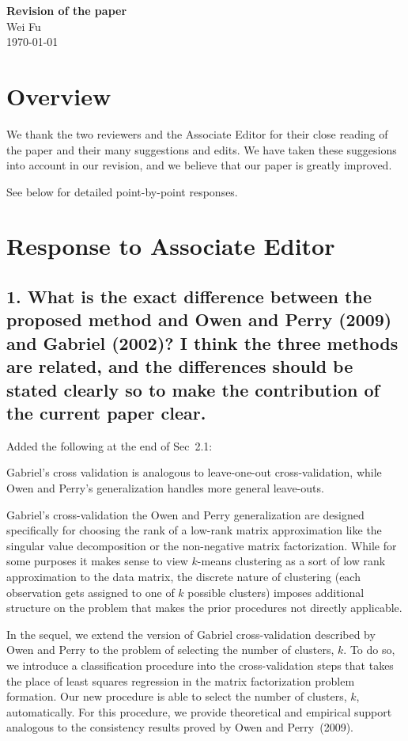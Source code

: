 \documentclass[11pt]{article}
\begin{document}
\begin{center}\textbf{\LARGE Revision of the paper}\\
Wei Fu \\
\today \\ \end{center}

\section{Overview}

We thank the two reviewers and the Associate Editor for their close reading of
the paper and their many suggestions and edits. We have taken these suggesions
into account in our revision, and we believe that our paper is greatly
improved.

See below for detailed point-by-point responses.


\section{Response to Associate Editor}

\subsection{1. What is the exact difference between the proposed method and Owen and
Perry (2009) and Gabriel (2002)? I think the three methods are related, and
the differences should be stated clearly so to make the contribution of the
current paper clear.}

Added the following at the end of Sec~2.1:

Gabriel's cross validation is analogous to leave-one-out cross-validation,
while Owen and Perry's generalization handles more general leave-outs.

Gabriel's cross-validation the Owen and Perry generalization are designed
specifically for choosing the rank of a low-rank matrix approximation like the
singular value decomposition or the non-negative matrix factorization. While
for some purposes it makes sense to view $k$-means clustering as a sort of low
rank approximation to the data matrix, the discrete nature of clustering (each
observation gets assigned to one of $k$ possible clusters) imposes additional
structure on the problem that makes the prior procedures not directly
applicable.

In the sequel, we extend the version of Gabriel cross-validation described by
Owen and Perry to the problem of selecting the number of clusters, $k$. To do
so, we introduce a classification procedure into the cross-validation steps
that takes the place of least squares regression in the matrix factorization
problem formation. Our new procedure is able to select the number of clusters,
$k$, automatically. For this procedure, we provide theoretical and empirical
support analogous to the consistency results proved by Owen and Perry~(2009).
\end{document}
